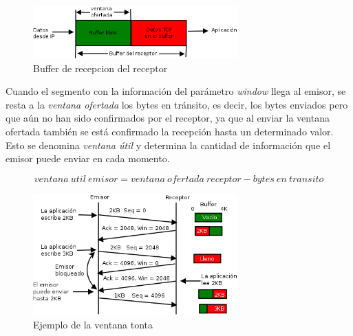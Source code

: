\documentclass[10pt,a4paper,spanish]{report}
\begin{document}
\begin{figure}[!h]
  \centering
  \includegraphics[width=0.7\textwidth]{buffer_recepcion}
  \caption{Buffer de recepcion del receptor}
  \label{bufferrecepcion}
\end{figure}

Cuando el segmento con la información del parámetro \textit{\textcolor{tema3}{window}} llega al emisor, se resta a la \textit{\textcolor{tema3}{ventana ofertada}} los bytes en tránsito, es decir, los bytes enviados pero que aún no han sido confirmados por el receptor, ya que al enviar la ventana ofertada también se está confirmado la recepción hasta un determinado valor. Esto se denomina \textit{\textcolor{tema3}{ventana útil}} y determina la cantidad de información que el emisor puede enviar en cada momento.

\begin{displaymath}
  ventana~util~emisor = ventana~ofertada~receptor - bytes~en~transito
\end{displaymath}

\begin{figure}[!h]
  \centering
  \includegraphics[width=0.7\textwidth]{ventanatonta}
  \caption{Ejemplo de la ventana tonta}
  \label{ventanatonta} 
\end{figure}
\end{document}
